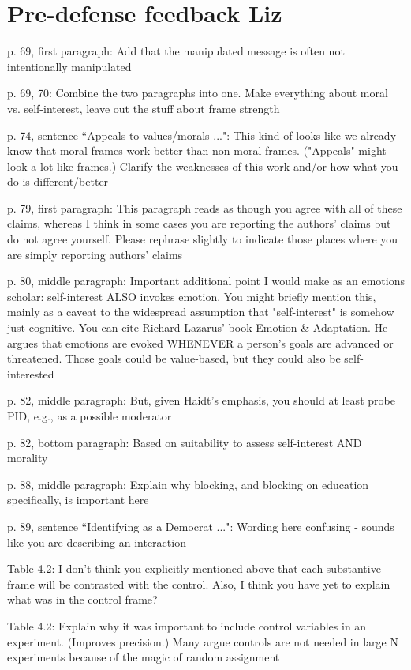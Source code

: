 \documentclass[12pt]{article}
\begin{document}
\section*{Pre-defense feedback Liz}
	\begin{coi}
		\item p. 69, first paragraph: Add that the manipulated message is often not intentionally manipulated
		\item p. 69, 70: Combine the two paragraphs into one. Make everything about moral vs. self-interest, leave out the stuff about frame strength
		\item p. 74, sentence ``Appeals to values/morals ...": This kind of looks like we already know that moral frames work better than non-moral frames. ("Appeals" might look a lot like frames.) Clarify the weaknesses of this work and/or how what you do is different/better
		\item p. 79, first paragraph: This paragraph reads as though you agree with all of these claims, whereas I think in some cases you are reporting the authors' claims but do not agree yourself. Please rephrase slightly to indicate those places where you are simply reporting authors' claims
		\item p. 80, middle paragraph: Important additional point I would make as an emotions scholar: self-interest ALSO invokes emotion. You might briefly mention this, mainly as a caveat to the widespread assumption that "self-interest" is somehow just cognitive. You can cite Richard Lazarus' book Emotion \& Adaptation. He argues that emotions are evoked WHENEVER a person's goals are advanced or threatened. Those goals could be value-based, but they could also be self-interested
		\item p. 82, middle paragraph: But, given Haidt's emphasis, you should at least probe PID, e.g., as a possible moderator
		\item p. 82, bottom paragraph: Based on suitability to assess self-interest AND morality
		\item p. 88, middle paragraph: Explain why blocking, and blocking on education specifically, is important here
		\item p. 89, sentence ``Identifying as a Democrat ...": Wording here confusing - sounds like you are describing an interaction
		\item Table 4.2: I don't think you explicitly mentioned above that each substantive frame will be contrasted with the control. Also, I think you have yet to explain what was in the control frame?
		\item Table 4.2: Explain why it was important to include control variables in an experiment. (Improves precision.) Many argue controls are not needed in large N experiments because of the magic of random assignment

\end{coi}
\end{document}
